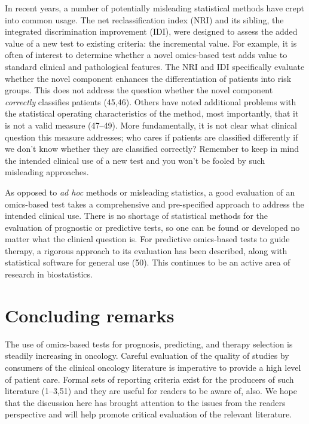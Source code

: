 \documentclass[11pt]{article}
\begin{document}
In recent years, a number of potentially misleading statistical methods
have crept into common usage. The net reclassification index (NRI) and
its sibling, the integrated discrimination improvement (IDI), were
designed to assess the added value of a new test to existing criteria:
the incremental value. For example, it is often of interest to determine
whether a novel omics-based test adds value to standard clinical and
pathological features. The NRI and IDI specifically evaluate whether the
novel component enhances the differentiation of patients into risk
groups. This does not address the question whether the novel component
\emph{correctly} classifies patients (45,46). Others have noted
additional problems with the statistical operating characteristics of
the method, most importantly, that it is not a valid measure (47--49).
More fundamentally, it is not clear what clinical question this measure
addresses; who cares if patients are classified differently if we don't
know whether they are classified correctly? Remember to keep in mind the
intended clinical use of a new test and you won't be fooled by such
misleading approaches.

As opposed to \emph{ad hoc} methods or misleading statistics, a good
evaluation of an omics-based test takes a comprehensive and
pre-specified approach to address the intended clinical use. There is no
shortage of statistical methods for the evaluation of prognostic or
predictive tests, so one can be found or developed no matter what the
clinical question is. For predictive omics-based tests to guide therapy,
a rigorous approach to its evaluation has been described, along with
statistical software for general use (50). This continues to be an
active area of research in biostatistics.

\section{Concluding remarks}\label{concluding-remarks}

The use of omics-based tests for prognosis, predicting, and therapy
selection is steadily increasing in oncology. Careful evaluation of the
quality of studies by consumers of the clinical oncology literature is
imperative to provide a high level of patient care. Formal sets of
reporting criteria exist for the producers of such literature (1--3,51)
and they are useful for readers to be aware of, also. We hope that the
discussion here has brought attention to the issues from the readers
perspective and will help promote critical evaluation of the relevant
literature.
\end{document}

